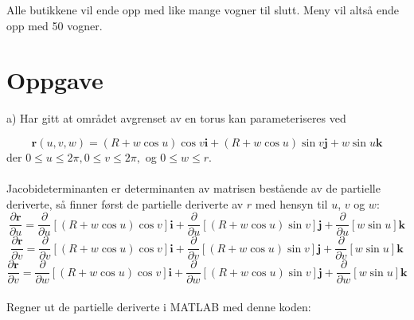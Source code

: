 Alle butikkene vil ende opp med like mange vogner til slutt. Meny vil altså ende opp med 50 vogner. 


\newpage
\section{Oppgave} %
a) Har gitt at området avgrenset av en torus kan parameteriseres ved

\begin{equation}\nonumber
    \boldsymbol{r}(u,v,w)=(R+w\cos{u})\cos{v}\boldsymbol{i}+(R+w\cos{u})\sin{v}\boldsymbol{j} + w\sin{u}\boldsymbol{k}
\end{equation}
der $0\leq u \leq 2\pi , 0 \leq v \leq 2\pi ,$ og $ 0 \leq w \leq r$.
\\\\ Jacobideterminanten er determinanten av matrisen bestående av de partielle deriverte, så finner først de partielle deriverte av $r$ med hensyn til $u$, $v$ og $w$:
\\
\begin{equation}\nonumber
    \frac{\partial\boldsymbol{r}}{\partial u} = \frac{\partial}{\partial u}[(R+w\cos{u})\cos{v}]\boldsymbol{i} + \frac{\partial}{\partial u}[(R+w\cos{u})\sin{v}]\boldsymbol{j} + \frac{\partial}{\partial u}[w \sin{u}]\boldsymbol{k}
\end{equation}
\begin{equation}\nonumber
    \frac{\partial\boldsymbol{r}}{\partial v} = \frac{\partial}{\partial v}[(R+w\cos{u})\cos{v}]\boldsymbol{i} + \frac{\partial}{\partial v}[(R+w\cos{u})\sin{v}]\boldsymbol{j} + \frac{\partial}{\partial v}[w \sin{u}]\boldsymbol{k}
\end{equation}
\begin{equation}\nonumber
    \frac{\partial\boldsymbol{r}}{\partial v} = \frac{\partial}{\partial w}[(R+w\cos{u})\cos{v}]\boldsymbol{i} + \frac{\partial}{\partial w}[(R+w\cos{u})\sin{v}]\boldsymbol{j} + \frac{\partial}{\partial w}[w \sin{u}]\boldsymbol{k}
\end{equation}
\\ Regner ut de partielle deriverte i MATLAB med denne koden: 
